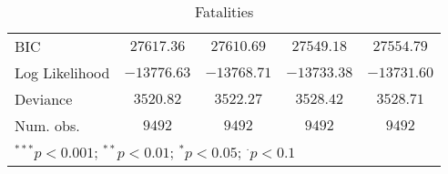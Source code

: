 \begin{sidewaystable}
\begin{center}
{\begin{tabular}{l c c c c}
BIC             & $27617.36$    & $27610.69$    & $27549.18$    & $27554.79$      \\
Log Likelihood  & $-13776.63$   & $-13768.71$   & $-13733.38$   & $-13731.60$     \\
Deviance        & $3520.82$     & $3522.27$     & $3528.42$     & $3528.71$       \\
Num. obs.       & $9492$        & $9492$        & $9492$        & $9492$          \\
\hline
\multicolumn{5}{l}{\scriptsize{$^{***}p<0.001$; $^{**}p<0.01$; $^{*}p<0.05$; $^{\cdot}p<0.1$}}
\end{tabular}
}
\caption{Fatalities}
\label{statebaseddeaths}
\end{center}
\end{sidewaystable}
